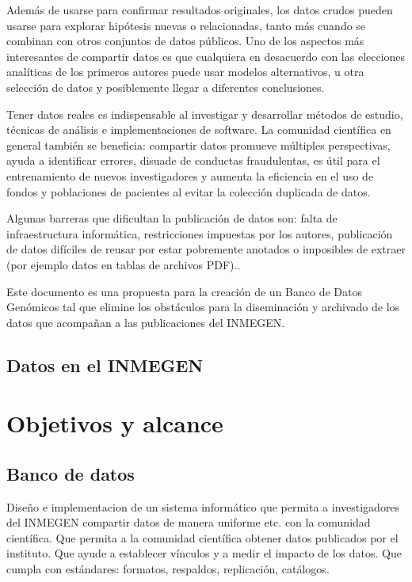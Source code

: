 \documentclass[
10pt, %
letterpaper, %
oneside, %
headinclude,footinclude, %
BCOR5mm, %
]{scrartcl}
\begin{document}
Además de usarse para confirmar resultados originales, los datos
crudos pueden usarse para explorar hipótesis nuevas o relacionadas,
tanto más cuando se combinan con otros conjuntos de datos públicos.
Uno de los aspectos más interesantes de compartir datos es que
cualquiera en desacuerdo con las elecciones analíticas de los primeros
autores puede usar modelos alternativos, u otra selección de datos y
posiblemente llegar a diferentes conclusiones.

Tener datos reales es indispensable al investigar y desarrollar
métodos de estudio, técnicas de análisis e implementaciones de
software. La comunidad científica en general también se beneficia:
compartir datos promueve múltiples perspectivas, ayuda a identificar
errores, disuade de conductas fraudulentas, es útil para el
entrenamiento de nuevos investigadores y aumenta la eficiencia en el
uso de fondos y poblaciones de pacientes al evitar la colección
duplicada de datos.\cite{piwowar_sharing_2007}

Algunas barreras que dificultan la publicación de datos son: falta de
infraestructura informática, restricciones impuestas por los autores,
publicación de datos difíciles de reusar por estar pobremente anotados
o imposibles de extraer (por ejemplo datos en tablas de archivos
PDF).\cite{molloy_open_2011}.

Este documento es una propuesta para la creación de un Banco de Datos
Genómicos tal que elimine los obstáculos para la diseminación y
archivado de los datos que acompañan a las publicaciones del INMEGEN.


\subsection{Datos en el INMEGEN}



\section{Objetivos y alcance}


\subsection{Banco de datos}

Diseño e implementacion de un sistema informático que permita a
investigadores del INMEGEN compartir datos de manera uniforme etc. con
la comunidad científica. Que permita a la comunidad científica obtener
datos publicados por el instituto. Que ayude a establecer vínculos y a
medir el impacto de los datos. Que cumpla con estándares: formatos,
respaldos, replicación, catálogos.
\cite{_data_????}
\cite{altman_proposed_2007}
\end{document}
